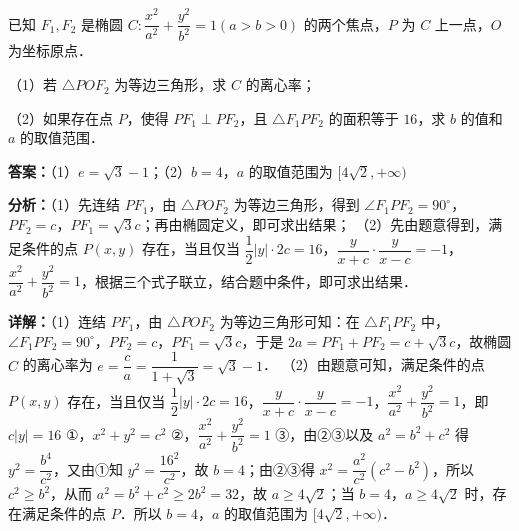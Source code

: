 \begin{question}[points=12]
已知 $F_1,F_2$ 是椭圆 $C:\dfrac{x^2}{a^2}+\dfrac{y^2}{b^2}=1(a>b>0)$ 的两个焦点，$P$ 为 $C$ 上一点，$O$ 为坐标原点．

（1）若 $\triangle POF_2$ 为等边三角形，求 $C$ 的离心率；

（2）如果存在点 $P$，使得 $PF_1\perp PF_2$，且 $\triangle F_1PF_2$ 的面积等于 $16$，求 $b$ 的值和 $a$ 的取值范围．
\begin{solution}
\textbf{答案：}（1）$e=\sqrt{3}-1$；（2）$b=4$，$a$ 的取值范围为 $[4\sqrt{2},+\infty)$

\textbf{分析：}（1）先连结 $PF_1$，由 $\triangle POF_2$ 为等边三角形，得到 $\angle F_1PF_2=90^\circ$，$PF_2=c$，$PF_1=\sqrt{3}c$；再由椭圆定义，即可求出结果；
（2）先由题意得到，满足条件的点 $P(x,y)$ 存在，当且仅当 $\dfrac{1}{2}|y|\cdot2c=16$，$\dfrac{y}{x+c}\cdot\dfrac{y}{x-c}=-1$，$\dfrac{x^2}{a^2}+\dfrac{y^2}{b^2}=1$，根据三个式子联立，结合题中条件，即可求出结果．

\textbf{详解：}（1）连结 $PF_1$，由 $\triangle POF_2$ 为等边三角形可知：在 $\triangle F_1PF_2$ 中，$\angle F_1PF_2=90^\circ$，$PF_2=c$，$PF_1=\sqrt{3}c$，于是 $2a=PF_1+PF_2=c+\sqrt{3}c$，故椭圆 $C$ 的离心率为 $e=\dfrac{c}{a}=\dfrac{1}{1+\sqrt{3}}=\sqrt{3}-1$．
（2）由题意可知，满足条件的点 $P(x,y)$ 存在，当且仅当 $\dfrac{1}{2}|y|\cdot2c=16$，$\dfrac{y}{x+c}\cdot\dfrac{y}{x-c}=-1$，$\dfrac{x^2}{a^2}+\dfrac{y^2}{b^2}=1$，即 $c|y|=16$ ①，$x^2+y^2=c^2$ ②，$\dfrac{x^2}{a^2}+\dfrac{y^2}{b^2}=1$ ③，由②③以及 $a^2=b^2+c^2$ 得 $y^2=\dfrac{b^4}{c^2}$，又由①知 $y^2=\dfrac{16^2}{c^2}$，故 $b=4$；由②③得 $x^2=\dfrac{a^2}{c^2}(c^2-b^2)$，所以 $c^2\ge b^2$，从而 $a^2=b^2+c^2\ge 2b^2=32$，故 $a\ge 4\sqrt{2}$；当 $b=4$，$a\ge 4\sqrt{2}$ 时，存在满足条件的点 $P$．所以 $b=4$，$a$ 的取值范围为 $[4\sqrt{2},+\infty)$．
\end{solution}
\end{question}

